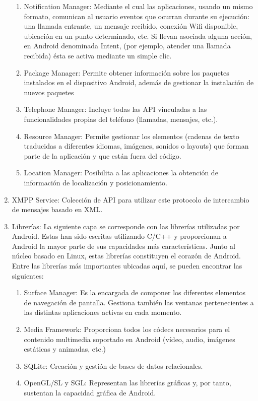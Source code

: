 \begin{enumerate}
\begin{enumerate}
\item	Notification Manager: Mediante el cual las aplicaciones,
 usando un mismo formato, comunican al usuario eventos que
 ocurran durante su ejecución: una llamada entrante, un mensaje recibido,
 conexión Wifi disponible, ubicación en un punto determinado, etc. 
Si llevan asociada alguna acción, en Android denominada Intent,
(por ejemplo, atender una llamada recibida) ésta se activa mediante un simple clic.
\item	Package Manager: Permite obtener información sobre los
 paquetes instalados en el dispositivo Android, además de
 gestionar la instalación de nuevos paquetes 
\item	Telephone Manager: Incluye todas las API vinculadas
 a las funcionalidades propias del teléfono (llamadas, mensajes, etc.).
\item	Resource Manager: Permite gestionar los elementos
 (cadenas de texto traducidas a diferentes idiomas, imágenes, sonidos o layouts)
 que forman parte de la aplicación y que están fuera del código.
\item	Location Manager: Posibilita a las aplicaciones la obtención
 de información de localización y posicionamiento.
\end{enumerate}
\item XMPP Service: Colección de API para utilizar este protocolo
 de intercambio de mensajes basado en XML. 
\item	Librerías: La siguiente capa se corresponde con las librerías
 utilizadas por Android. Estas han sido escritas utilizando C/C++ y
 proporcionan a Android la mayor parte de sus capacidades 
más características. Junto al núcleo basado en Linux, estas librerías 
constituyen el corazón de Android.
Entre las librerías más importantes ubicadas aquí, se pueden
 encontrar las siguientes:
\begin{enumerate}
\item	Surface Manager: Es la encargada de componer los 
diferentes elementos de navegación de pantalla. Gestiona
 también las ventanas pertenecientes a las distintas
 aplicaciones activas en cada momento.
\item	Media Framework: Proporciona todos los códecs necesarios 
para el contenido multimedia soportado en Android (vídeo, audio,
 imágenes estáticas y animadas, etc.)
\item	SQLite: Creación y gestión de bases de datos relacionales.
\item	OpenGL/SL y SGL: Representan las librerías gráficas y,
 por tanto, sustentan la capacidad gráfica de Android.

\end{enumerate}
\end{enumerate}
